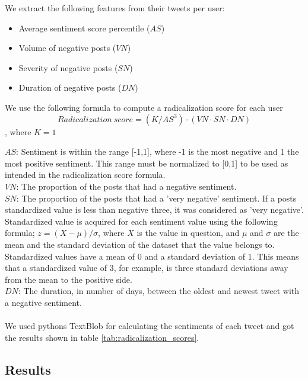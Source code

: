 \documentclass[conference]{IEEEtran}
\begin{document}
We extract the following features from their tweets per user:
\begin{itemize}
  \item Average sentiment score percentile (\(AS\))
  \item Volume of negative posts (\(VN\))
  \item Severity of negative posts (\(SN\))
  \item Duration of negative posts (\(DN\))
\end{itemize}
We use the following formula to compute a radicalization score for each user
\[Radicalization\: score = (K /AS^3) \cdot (VN \cdot SN \cdot DN)\], where \(K = 1\)


\(AS\): Sentiment is within the range [-1,1], where -1 is the most negative and 1 the most positive sentiment.
 This range must be normalized to [0,1] to be used as intended in the radicalization score formula.\\ %
\(VN\): The proportion of the posts that had a negative sentiment.\\
\(SN\): The proportion of the posts that had a 'very negative' sentiment. If a posts standardized value is less than negative three, it was considered as 'very negative'.
Standardized value is acquired for each sentiment value using the following formula;
\(z = (X - \mu)/\sigma\), where \(X\) is the value in question, and \(\mu\) and \(\sigma\) are the mean and the standard deviation of the dataset that the value belongs to. Standardized values have a mean of \(0\) and a standard deviation of \(1\). This means that a standardized value of 3, for example, is three standard deviations away from the mean to the positive side.\\
\(DN\): The duration, in number of days, between the oldest and newest tweet with a negative sentiment. \\
\\
We used pythons TextBlob for calculating the sentiments of each tweet and got the results shown in table \ref{tab:radicalization_scores}.

\subsection{Results}
\end{document}
